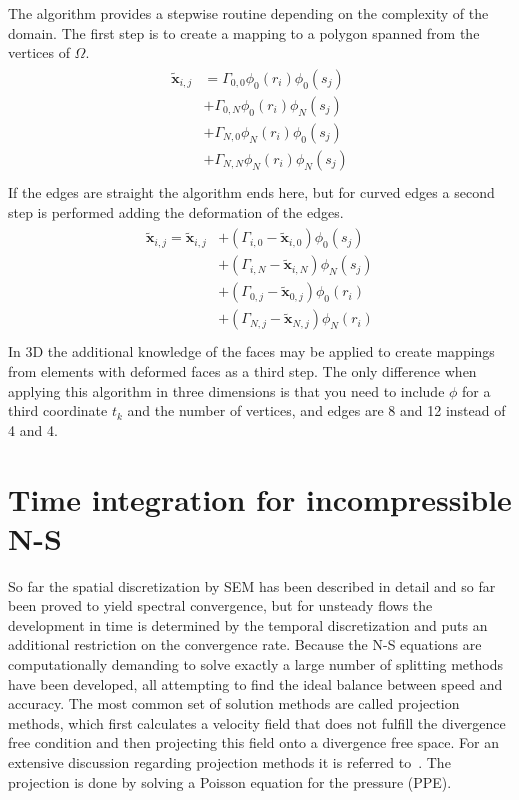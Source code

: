 The algorithm provides a stepwise routine depending on the complexity of the domain. The first step is to create 
a mapping to a polygon spanned from the vertices of $\Omega$.
%
\begin{align}
    \begin{split}
    \mathbf{\tilde{x}}_{i,j} 
             &=\Gamma_{0,0}\phi_0(r_i)\phi_0(s_j)\\
             &+\Gamma_{0,N}\phi_0(r_i)\phi_N(s_j)\\
             &+\Gamma_{N,0}\phi_N(r_i)\phi_0(s_j)\\
             &+\Gamma_{N,N}\phi_N(r_i)\phi_N(s_j)\\
    \end{split}
    \label{eq:gh1}
\end{align}
%
If the edges are straight the algorithm ends here, but for curved edges a second step is performed adding 
the deformation of the edges.
%
\begin{align}
    \begin{split}
        \mathbf{\tilde{x}}_{i,j}  = \mathbf{\tilde{x}}_{i,j} 
             &+(\Gamma_{i,0}-\mathbf{\tilde{x}}_{i,0})\phi_0(s_j)\\
             &+(\Gamma_{i,N}-\mathbf{\tilde{x}}_{i,N})\phi_N(s_j)\\
             &+(\Gamma_{0,j}-\mathbf{\tilde{x}}_{0,j})\phi_0(r_i)\\
             &+(\Gamma_{N,j}-\mathbf{\tilde{x}}_{N,j})\phi_N(r_i)\\
    \end{split}
    \label{eq:gh1}
\end{align}
%
In 3D the additional knowledge of the faces may be applied to create mappings from elements with deformed faces as a 
third step. The only difference when applying this algorithm in three dimensions is that you need to include $\phi$
for a third coordinate $t_k$ and the number of vertices, and edges are 8 and 12 instead of 
4 and 4.



\section{Time integration for incompressible N-S} \label{timeNS}

So far the spatial discretization by SEM has been described in detail and so far been proved to yield spectral convergence,
but for unsteady flows the development in time is determined by the temporal discretization and puts an additional 
restriction on the convergence rate. Because the N-S equations are computationally demanding to solve exactly 
a large number of splitting methods have been developed, all attempting to find the ideal balance between speed 
and accuracy. The most common set of solution methods are called projection methods, which first calculates 
a velocity field that does not fulfill the divergence free condition and then projecting this field onto a 
divergence free space. For an extensive discussion regarding projection methods it is referred to~\cite{Guermond2006}.
The projection is done by solving a Poisson equation for the pressure (PPE). 


